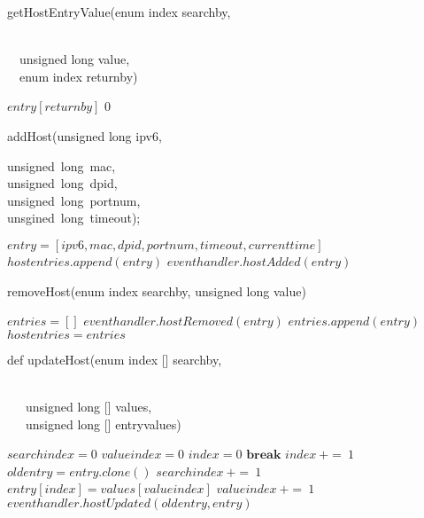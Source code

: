 \documentclass[10pt,a4paper,titlepage]{report}
\begin{document}
\newpage

\begin{algorithm}
	\caption{getHostEntryValue(enum index searchby,} \\
	\qquad \qquad \qquad \qquad \qquad \ \ unsigned long value, \\
	\qquad \qquad \qquad \qquad \qquad \ \ enum index returnby)
	\begin{algorithmic}[1]
				\RETURN $entry[returnby]$
			\ENDIF
		\ENDFOR
		\RETURN $0$
	\end{algorithmic}
\end{algorithm}


\begin{algorithm}
	\caption{addHost(unsigned long ipv6,}
		unsigned\ long\ mac,\\
		\qquad \qquad \qquad unsigned\ long\ dpid,\\
		\qquad \qquad \qquad unsigned\ long\ portnum,\\
		\qquad \qquad \qquad unsgined\ long\ timeout);
	\begin{algorithmic}[1]
		\STATE $entry = [ipv6, mac, dpid, portnum, timeout, currenttime]$
		\STATE $hostentries.append(entry)$
		\STATE $eventhandler.hostAdded(entry)$
	\end{algorithmic}
\end{algorithm}

\begin{algorithm}
	\caption{removeHost(enum index searchby, unsigned long value)}
	\begin{algorithmic}[1]
		\STATE $entries = []$
				\STATE $eventhandler.hostRemoved(entry)$
			\ELSE
				\STATE $entries.append(entry)$
			\ENDIF
		\ENDFOR
		\STATE $hostentries = entries$
	\end{algorithmic}
\end{algorithm}

\newpage

\begin{algorithm}
	\caption{def updateHost(enum index [] searchby,}\\ 
	\qquad \qquad \qquad \qquad \ \ \ unsigned long [] values,\\
	\qquad \qquad \qquad \qquad \ \ \ unsigned long [] entryvalues)
	\begin{algorithmic}[1]
		\STATE $searchindex = 0$
		\STATE $valueindex = 0$
				\STATE $index = 0$
					\STATE $\textbf{break}$
				\ENDIF
				\STATE $index\ +=\ 1$
			\ENDFOR
				\STATE $oldentry = entry.clone()$
						\STATE $searchindex\ +=\ 1$
					\ELSE
						\STATE $entry[index] = values[valueindex]$
						\STATE $valueindex\ +=\ 1$
					\ENDIF
				\ENDFOR
				\STATE $eventhandler.hostUpdated(oldentry, entry)$
			\ENDIF
		\ENDFOR
	\end{algorithmic}
\end{algorithm}
\end{document}
